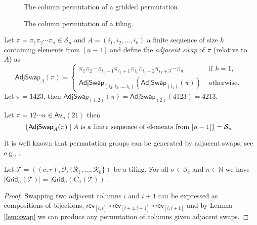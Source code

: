\begin{figure}[H]
    \centering
    
    \caption{The column permutation of a gridded permutation.}
    \label{fig:gp_col_perm}
\end{figure}

\begin{figure}[!htbp]
    \centering
    
    \caption{The column permutation of a tiling.}
    \label{fig:t_col_perm}
\end{figure}

Let $\pi=\pi_1\pi_2 \dotsm \pi_n \in\mathcal{S}_n$ and $A = (i_1, i_2,\dotsc,i_k)$ a finite sequence of size $k$ containing elements from $[n-1]$ and define the \emph{adjacent swap} of $\pi$ (relative to $A$) as
\[
\textsf{AdjSwap}_{A}(\pi) = \begin{cases}
\pi_1\pi_2 \dotsm \pi_{i_1-1}\pi_{i_1+1}\pi_{i_1}\pi_{i_1+2}\pi_{i_1+3} \dotsm \pi_n & \mbox{ if } k = 1,\\
\textsf{AdjSwap}_{(i_2,i_3,\dotsc,i_k)}\left(\textsf{AdjSwap}_{(i_1)}(\pi)\right) & \mbox{ otherwise.}
\end{cases}
\]
Let $\pi = 1423$, then $\textsf{AdjSwap}_{(1,2)}(\pi) = \textsf{AdjSwap}_{(2)}(4123) = 4213$.

\begin{lemma}\label{lem:swap}
Let $\pi = 12\dotsm n \in \textsf{Av}_n(21)$ then
\[
    \left\{\textsf{AdjSwap}_A(\pi) \mid A \text{ is a finite sequence of elements from } [n-1]\right\} = \mathcal{S}_n
\]
\end{lemma}
It is well known that permutation groups can be generated by adjacent swaps, see e.g., \cite{adjacentperm}.

\begin{comment}\begin{proof}
Suppose we can generate $\mathcal{S}_{n-1}$ this way from the permutation in $\textsf{Av}_{n-1}(21)$ and let $\pi = \pi_1 \pi_2 \dotsm \pi_n \in \mathcal{S}_n$ with $\pi_j = n$. Let $A = (i_1,i_2,\dotsc,i_k)$ be the sequence of swaps that turns $12\dotsm (n-1)$ into $\pi_1 \pi_2 \dotsm \pi_{j-1}\pi_{j+1}\dotsm \pi_n \in \mathcal{S}_{n-1}$, then
\begin{align*}
    \textsf{AdjSwap}_{(i_1,i_2,\dotsc,i_k, n-1, n-2,\dotsc,j)}(12\dotsm n) = \pi
\end{align*}
and since this holds for a base case, it holds for all sizes $n\in\N$.
\end{proof}\end{comment}

\begin{proposition}
Let $\mathcal{T} = ((c,r),\mathcal{O},\{\mathcal{R}_1,\dotsc,\mathcal{R}_k\})$ be a tiling. For all $\sigma\in\mathcal{S}_c$ and $n\in\mathbb{N}$ we have $|\textsf{Grid}_n(\mathcal{T})| = |\textsf{Grid}_n\left(C_\sigma(\mathcal{T})\right)|$.
\end{proposition}
\begin{proof}
Swapping two adjacent columns $i$ and $i+1$ can be expressed as compositions of bijections, $\textsf{rev}_{[i,i]} \circ \textsf{rev}_{[i+1,i+1]} \circ \textsf{rev}_{[i,i+1]}$ and by Lemma \ref{lem:swap} we can produce any permutation of columns given adjacent swaps.
\end{proof}